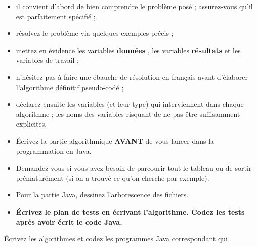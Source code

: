 \documentclass[11pt,a4paper]{article}
\begin{document}
					\begin{itemize}
				
			\item il convient d'abord de bien comprendre le probl\`eme pos\'e ; assurez-vous qu'il est parfaitement sp\'ecifi\'e ;
			\item r\'esolvez le probl\`eme via quelques exemples pr\'ecis ;
			\item mettez en \'evidence les variables \textbf{\guillemotleft  donn\'ees \guillemotright }, les variables \textbf{\guillemotleft  r\'esultats \guillemotright } et les variables de travail ;
			\item n'h\'esitez pas \`a faire une \'ebauche de r\'esolution en fran\c cais avant d'\'elaborer l'algorithme d\'efinitif pseudo-cod\'e ;
			\item d\'eclarez ensuite les variables (et leur type) qui interviennent dans chaque algorithme ; les noms des variables risquant de ne pas \^etre suffisamment explicites.
			\item \'Ecrivez la partie algorithmique \textbf{AVANT} de vous lancer dans la programmation en Java.
			\item Demandez-vous si vous avez besoin de parcourir tout le tableau ou de sortir pr\'ematur\'ement (si on a trouv\'e ce qu'on cherche par exemple).
			\item Pour la partie Java, dessinez l'arborescence des fichiers. 
			\item \textbf{\'Ecrivez le plan de tests en \'ecrivant l'algorithme. Codez les tests apr\`es avoir \'ecrit le code Java.}
					\end{itemize}
				
            \par
        
        \'Ecrivez les algorithmes et codez les programmes Java correspondant qui 
          
\end{document}

